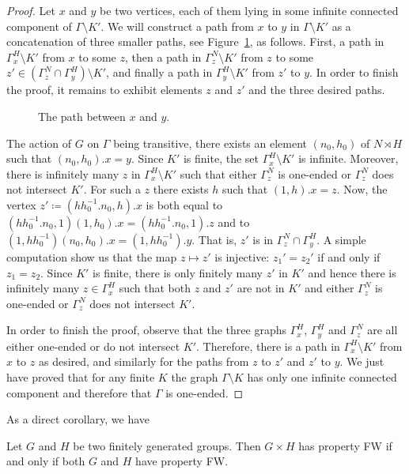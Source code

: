 \begin{proof}
Let $x$ and $y$ be two vertices, each of them lying in some infinite connected component of $\Gamma\setminus K'$.
We will construct a path from $x$ to $y$ in $\Gamma\setminus K'$ as a concatenation of three smaller paths, see Figure~\ref{Figure:PathSemiDirect}, as follows.
First, a path in $\Gamma_x^H\setminus K'$ from $x$ to some $z$, then a path in $\Gamma_z^N\setminus K'$ from $z$ to some $z'\in (\Gamma_z^N\cap \Gamma_y^H)\setminus K'$, and finally a path in $\Gamma_y^H\setminus K'$ from $z'$ to $y$.
In order to finish the proof, it remains to exhibit elements $z$ and $z'$ and the three desired paths.
%
%
\begin{figure}[htbp]\centering
\scalebox{01}{
}
\caption{The path between $x$ and $y$.}
\label{Figure:PathSemiDirect}
\end{figure}
%
%

The action of $G$ on $\Gamma$ being transitive, there exists an element $(n_0,h_0)$ of $N \rtimes H$ such that $(n_0,h_0).x = y$.
Since $K'$ is finite, the set $\Gamma_x^H\setminus K'$ is infinite.
Moreover, there is infinitely many $z$ in $\Gamma_x^H\setminus K'$ such that either $\Gamma_z^N$ is one-ended or $\Gamma_z^N$ does not intersect $K'$.
For such a $z$ there exists $h$ such that $(1,h).x=z$.
Now, the vertex $z'\coloneqq(hh_0^{-1}.n_0,h).x$ is both equal to $(hh_0^{-1}.n_0,1)(1,h_0).x=(hh_0^{-1}.n_0,1).z$ and to $(1,hh_0^{-1})(n_0,h_0).x=(1,hh_0^{-1}).y$. That is, $z'$ is in $\Gamma_z^N\cap \Gamma_y^H$.
A simple computation show us that the map $z\mapsto z'$ is injective: $z_1'=z_2'$ if and only if $z_1=z_2$.
Since $K'$ is finite, there is only finitely many $z'$ in $K'$ and hence there is infinitely many $z\in \Gamma_x^H$ such that both $z$ and $z'$ are not in $K'$ and either $\Gamma_z^N$ is one-ended or $\Gamma_z^N$ does not intersect $K'$.

In order to finish the proof, observe that the three graphs $\Gamma_x^H$, $\Gamma_y^H$ and $\Gamma_z^N$ are all either one-ended or do not intersect $K'$.
Therefore, there is a path in $\Gamma_x^H\setminus K'$ from $x$ to $z$ as desired, and similarly for the paths from $z$ to $z'$ and $z'$ to $y$.
We just have proved that for any finite $K$ the graph $\Gamma\setminus K$ has only one infinite connected component and therefore that $\Gamma$ is one-ended.
\end{proof}
%
%
As a direct corollary, we have
\begin{cor}
Let $G$ and $H$ be two finitely generated groups. Then $G\times H$ has property FW if and only if both $G$ and $H$ have property FW.
\end{cor}
